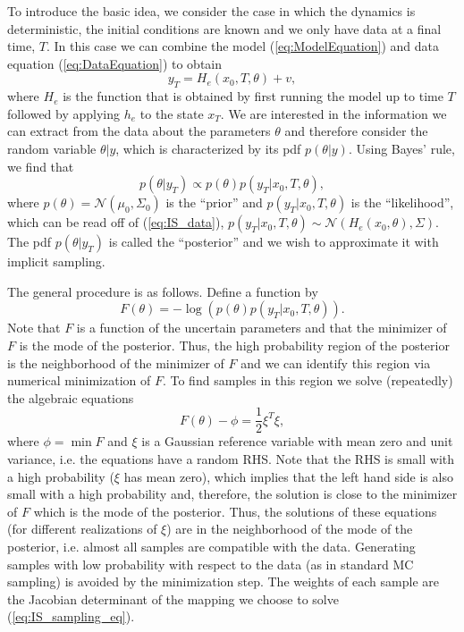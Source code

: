\documentclass[11pt]{article}
\begin{document}
To introduce the basic idea,
we consider the case in which the dynamics is deterministic, the initial conditions are known and we only have data at a final time, $T$.
In this case we can combine the model (\ref{eq:ModelEquation}) and data equation (\ref{eq:DataEquation}) to obtain
\begin{equation}
\label{eq:IS_data}
	y_T = H_e(x_0,T,\theta)+v,
\end{equation}
where $H_e$ is the function that is obtained by first running the model up
to time $T$ followed by applying $h_e$ to the state $x_T$. We are interested in the information we can extract from the data about the parameters $\theta$ and
therefore consider the random variable $\theta|y$, which is characterized by its pdf $p(\theta|y)$. Using Bayes' rule, we find that
\begin{equation}
\label{eq:post}
	p(\theta|y_T) \propto p(\theta)p(y_T|x_0,T,\theta),
\end{equation}
where  $p(\theta) = \mathcal{N}(\mu_0,\Sigma_0)$ is the ``prior'' and $p(y_T|x_0,T,\theta)$ is the ``likelihood'',
which can be read off of (\ref{eq:IS_data}), $p(y_T|x_0,T,\theta)\sim \mathcal{N}(H_e(x_0,\theta),\Sigma)$.
The pdf $p(\theta|y_T)$  is called the ``posterior'' and we wish to approximate it with implicit sampling. 

The general procedure is as follows. Define a function by
\begin{equation}
	F(\theta)= -\log \left(p(\theta)p(y_T|x_0,T,\theta)\right).
\end{equation}
Note that $F$ is a function of the uncertain parameters and that the minimizer of $F$ is the mode of the posterior. Thus, the high probability region of the posterior is the neighborhood of the minimizer of $F$ and we can identify this region via numerical minimization of $F$. To find samples in this region we solve (repeatedly) the algebraic equations
\begin{equation}
\label{eq:IS_sampling_eq}
	F(\theta)-\phi = \frac{1}{2}\xi^T\xi,
\end{equation}
where $\phi = \min F$ and $\xi$ is a Gaussian reference variable with mean zero and unit variance, i.e. the equations have a random RHS.
Note that the RHS is small with a high probability ($\xi$ has mean zero), which implies that the left hand side is also small with a high probability and, therefore, the solution is close to the minimizer of $F$ which is the mode of the posterior.
Thus, the solutions of these equations (for different realizations of $\xi$) are in the neighborhood of the mode of the posterior, i.e. almost all samples are compatible with the data.
Generating samples with low probability with respect to the data (as in standard MC sampling) is avoided by the minimization step. The weights of each sample are the Jacobian determinant of the mapping we choose to solve (\ref{eq:IS_sampling_eq}).
\end{document}
